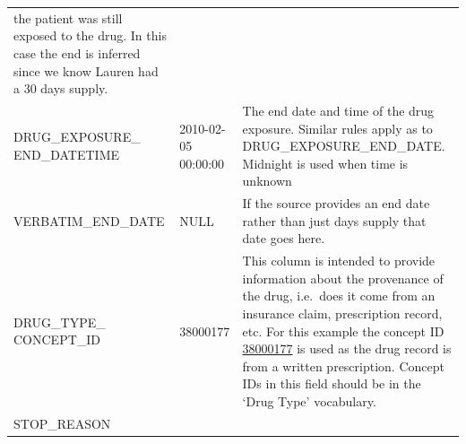 \documentclass[]{book}
\begin{document}
\begin{longtable}[]{@{}lll@{}}
\begin{minipage}[t]{0.47\columnwidth}
the patient was still exposed to the drug. In this case the end is
inferred since we know Lauren had a 30 days supply.\strut
\end{minipage}\tabularnewline
\begin{minipage}[t]{0.30\columnwidth}\raggedright\strut
DRUG\_EXPOSURE\_ END\_DATETIME\strut
\end{minipage} & \begin{minipage}[t]{0.14\columnwidth}\raggedright\strut
2010-02-05 00:00:00\strut
\end{minipage} & \begin{minipage}[t]{0.47\columnwidth}\raggedright\strut
The end date and time of the drug exposure. Similar rules apply as to
DRUG\_EXPOSURE\_END\_DATE. Midnight is used when time is unknown\strut
\end{minipage}\tabularnewline
\begin{minipage}[t]{0.30\columnwidth}\raggedright\strut
VERBATIM\_END\_DATE\strut
\end{minipage} & \begin{minipage}[t]{0.14\columnwidth}\raggedright\strut
NULL\strut
\end{minipage} & \begin{minipage}[t]{0.47\columnwidth}\raggedright\strut
If the source provides an end date rather than just days supply that
date goes here.\strut
\end{minipage}\tabularnewline
\begin{minipage}[t]{0.30\columnwidth}\raggedright\strut
DRUG\_TYPE\_ CONCEPT\_ID\strut
\end{minipage} & \begin{minipage}[t]{0.14\columnwidth}\raggedright\strut
38000177\strut
\end{minipage} & \begin{minipage}[t]{0.47\columnwidth}\raggedright\strut
This column is intended to provide information about the provenance of
the drug, i.e.~does it come from an insurance claim, prescription
record, etc. For this example the concept ID
\href{http://athena.ohdsi.org/search-terms/terms/38000177}{38000177} is
used as the drug record is from a written prescription. Concept IDs in
this field should be in the `Drug Type' vocabulary.\strut
\end{minipage}\tabularnewline
\begin{minipage}[t]{0.30\columnwidth}\raggedright\strut
STOP\_REASON\strut
\end{minipage} & \begin{minipage}[t]{0.14\columnwidth}\raggedright\strut

\end{minipage}
\end{longtable}
\end{document}
